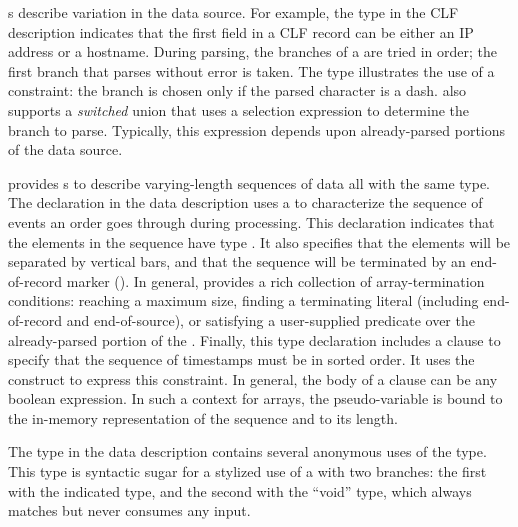 \documentclass[11pt]{article}
\begin{document}
s describe variation in the data source.  For example, the
 type in the CLF description indicates that the first field 
in a CLF record can be either an IP address or a hostname.  During parsing, 
the branches of a  are tried in order; the first branch that 
parses without error is taken.  The  type illustrates the use
of a constraint: the branch  is chosen only if the parsed
character is a dash.  \pads{} also supports a \textit{switched} union that uses a selection expression to determine the branch to parse.  Typically, this expression depends upon already-parsed portions of the data source.

\pads{} provides s to describe varying-length sequences of data all 
with the same type.  The  declaration in the \dibbler{} data description
uses a  to characterize the sequence of events an
order goes through during processing.  This declaration indicates that the elements
in the sequence have type .  It also specifies that the elements will
be separated by vertical bars, and that the sequence will be terminated by 
an end-of-record marker ().  In general, \pads{} provides a rich collection
of array-termination conditions: reaching a maximum size, finding a terminating
literal (including end-of-record and end-of-source),
or satisfying a user-supplied predicate over the already-parsed portion of 
the .  Finally, this type declaration includes a  clause
to specify that the sequence of timestamps must be in sorted order.
It uses the  construct to express this constraint.
In general, the body of a  clause can be any boolean expression.
In such a context for arrays, the pseudo-variable  is bound to the in-memory representation of the sequence and  to its length.


The  type in the \dibbler{} data description contains several
anonymous uses of the  type.  This type is syntactic sugar for a 
stylized use of a  with two branches: the first with the indicated type, 
and the second with the ``void'' type, which  
always matches but never consumes any input.
\end{document}
